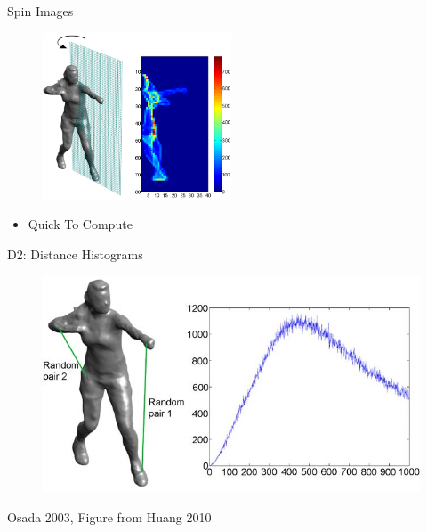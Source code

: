 \documentclass{beamer}
\begin{document}
\begin{frame}{Spin Images}

\begin{figure}[t]
	\centering
    \includegraphics[width=0.5\textwidth]{SpinImage.png}
\end{figure}


\begin{itemize}[label=$\vartriangleright$]
\item \textcolor<2->{MidYellow}{Quick To Compute}
\end{itemize}

\end{frame}

\begin{frame}{D2: Distance Histograms}

\begin{figure}[t]
	\centering
    \includegraphics[width=\textwidth]{D2.png}
\end{figure}

\small Osada 2003, Figure from Huang 2010

\end{frame}
\end{document}
